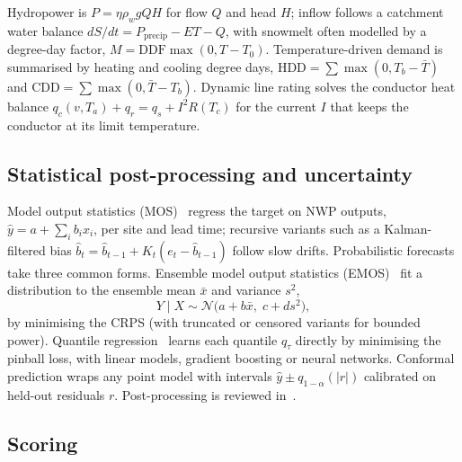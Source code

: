 Hydropower is $P=\eta\rho_wgQH$ for flow $Q$ and head $H$; inflow follows a catchment water balance $dS/dt=P_{\text{precip}}-ET-Q$, with snowmelt often modelled by a degree-day factor, $M=\text{DDF}\max(0,T-T_0)$. Temperature-driven demand is summarised by heating and cooling degree days, $\text{HDD}=\sum\max(0,T_b-\bar T)$ and $\text{CDD}=\sum\max(0,\bar T-T_b)$. Dynamic line rating solves the conductor heat balance $q_c(v,T_a)+q_r=q_s+I^2R(T_c)$ for the current $I$ that keeps the conductor at its limit temperature.

\subsection{Statistical post-processing and uncertainty}

Model output statistics (MOS)~\cite{glahn1972mos} regress the target on NWP outputs, $\hat y=a+\sum_ib_ix_i$, per site and lead time; recursive variants such as a Kalman-filtered bias $\hat b_t=\hat b_{t-1}+K_t(e_t-\hat b_{t-1})$ follow slow drifts. Probabilistic forecasts take three common forms. Ensemble model output statistics (EMOS)~\cite{gneiting2005emos} fit a distribution to the ensemble mean $\bar x$ and variance $s^2$,
\begin{equation}
Y\mid X\sim\mathcal N\big(a+b\bar x,\;c+ds^2\big),
\end{equation}
by minimising the CRPS (with truncated or censored variants for bounded power). Quantile regression~\cite{koenker1978quantile} learns each quantile $q_\tau$ directly by minimising the pinball loss, with linear models, gradient boosting or neural networks. Conformal prediction wraps any point model with intervals $\hat y\pm q_{1-\alpha}(|r|)$ calibrated on held-out residuals $r$. Post-processing is reviewed in~\cite{vannitsem2021postprocessing}.

\subsection{Scoring}

